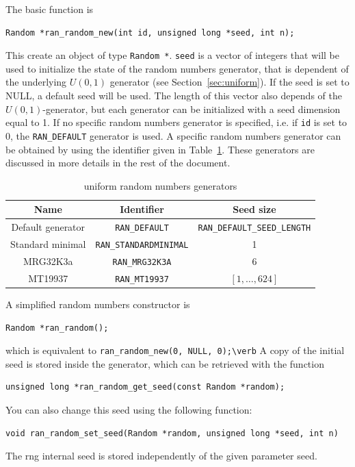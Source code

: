 The basic function is
\begin{verbatim}
Random *ran_random_new(int id, unsigned long *seed, int n);
\end{verbatim}
This create an object of type \verb|Random *|.
\verb|seed| is a vector of integers that will be used to initialize
the state of the random numbers generator, that is dependent of the
underlying $U(0,1)$ generator (see Section~\ref{sec:uniform}).
If the seed is set to NULL, a default seed will be used.
The length of this vector also depends of the $U(0,1)$-generator, but
each generator can be initialized with a seed dimension equal to 1.
If no specific random numbers generator is specified, i.e. if
\verb|id| is set to 0, the
\verb|RAN_DEFAULT| generator is used.
A specific random numbers generator can be obtained by using the
identifier given in Table~\ref{tab:generators}.
These generators are discussed in more details in the rest of the
document.
\begin{table}[htb]
\begin{center}
\begin{tabular}{|c|c|c|}
\hline
{\bf Name} & {\bf Identifier} & {\bf Seed size} \\
\hline
Default generator & \verb|RAN_DEFAULT| & \verb|RAN_DEFAULT_SEED_LENGTH| \\
\hline
Standard minimal & \verb|RAN_STANDARDMINIMAL| & 1 \\
\hline
MRG32K3a & \verb|RAN_MRG32K3A| & 6 \\
\hline
MT19937 & \verb|RAN_MT19937| & $[1,\ldots,624]$\\
\hline
\end{tabular}
\caption{uniform random numbers generators}
\label{tab:generators}
\end{center}
\end{table}

A simplified random numbers constructor is
\begin{verbatim}
Random *ran_random();
\end{verbatim}
which is equivalent to \verb|ran_random_new(0, NULL, 0);\verb|
A copy of the initial seed is stored inside the generator, which can
be retrieved with the function
\begin{verbatim}
unsigned long *ran_random_get_seed(const Random *random);
\end{verbatim}
You can also change this seed using the following function:
\begin{verbatim}
void ran_random_set_seed(Random *random, unsigned long *seed, int n)
\end{verbatim}
The rng internal seed is stored independently of the given parameter seed.

